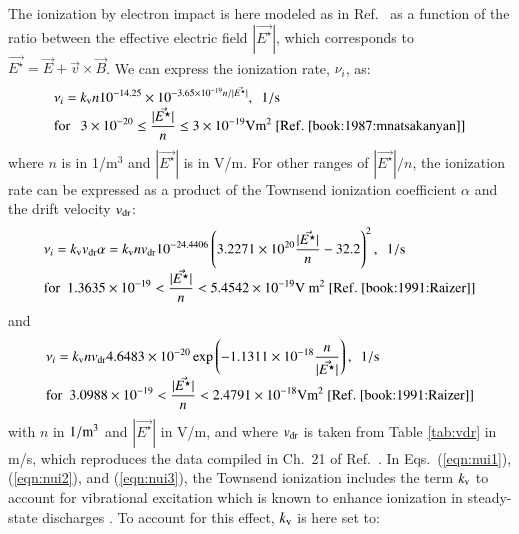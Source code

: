\documentclass{warpdoc}
\newcommand{\mfd}{\displaystyle}
\let\citen\cite
\begin{document}
The ionization by electron impact is here modeled as in Ref.\ \citen{misc:2002:macheret} as a function of the ratio between the effective electric field $|\vec{E^\star}|$,
which corresponds to  $\vec{E^\star}=\vec{E}+\vec{v}\times\vec{B}$.
We can express the ionization rate, $\nu_i$, as:\cite{misc:1975:dutton,misc:1983:gallagher}
%
\begin{equation}
\begin{array}{l}
\mfd {\nu_i} = k_{\rm v} n 10^{-14.25} \times 10^{-3.65\times 10^{-19} n/|\vec{E^\star}|}, {~~\rm 1/s} \\
\mfd {\rm for}~~~3\times 10^{-20} \leq \frac{|\vec{E^\star}|}{n} \leq 3\times 10^{-19} {\rm V m^2} {\rm ~[Ref.~\citen{book:1987:mnatsakanyan}]}
\end{array}
\label{eqn:nui1}
\end{equation}
%
where $n$ is in 1/m$^3$ and $|\vec{E^\star}|$ is in V/m. For other ranges of $|\vec{E^\star}|/n$, the ionization rate can be expressed as a product of the Townsend ionization coefficient $\alpha$ and the drift velocity ${v_{\rm dr}}$:
%
\begin{equation}
\begin{array}{l}
  \mfd {\nu_i}=k_{\rm v}  {v_{\rm dr}} \alpha=k_{\rm v}  n {v_{\rm dr}}  10^{-24.4406}  \left(3.2271 \times 10^{20}\frac{|\vec{E^\star}|}{n} - 32.2   \right)^2, ~~{\rm 1/s}  \\
  \mfd {\rm for~~} 1.3635 \times 10^{-19} < \frac{|\vec{E^\star}|}{ n} < 5.4542 \times 10^{-19} {\rm V~m^2}{\rm ~[Ref.~\citen{book:1991:Raizer}]}
\end{array}
\label{eqn:nui2}
\end{equation}
%
and
%
\begin{equation}
\begin{array}{l}
  \mfd {\nu_i}=k_{\rm v} n {v_{\rm dr}} 4.6483 \times 10^{-20} \exp \left( -1.1311 \times 10^{-18} \frac{n} {|\vec{E^\star}|}  \right),  ~~{\rm 1/s} \\
  \mfd {\rm for~~} 3.0988 \times 10^{-19} < \frac{|\vec{E^\star}|}{n} < 2.4791 \times 10^{-18} {\rm V m^2} {\rm ~[Ref.~\citen{book:1991:Raizer}]}
\end{array}
\label{eqn:nui3}
\end{equation}
%
with $n$ in $\rm 1/m^3$ and $|\vec{E^\star}|$ in V/m, and where ${v_{\rm dr}}$ is taken
from Table \ref{tab:vdr} in m/s, which reproduces the data compiled in Ch.\ 21 of Ref.\ \citen{book:1997:grigoriev}. In Eqs.\ (\ref{eqn:nui1}), (\ref{eqn:nui2}), and (\ref{eqn:nui3}),
the Townsend ionization includes the term $k_{\rm v}$ to account for vibrational excitation which is known to enhance ionization in steady-state discharges \cite{book:1987:mnatsakanyan,misc:1978:aleksandrov,misc:1978:son}. To account for this effect, $k_{\rm v}$ is here set to:\cite{book:1987:mnatsakanyan,misc:1978:aleksandrov,misc:1978:son}
\end{document}
